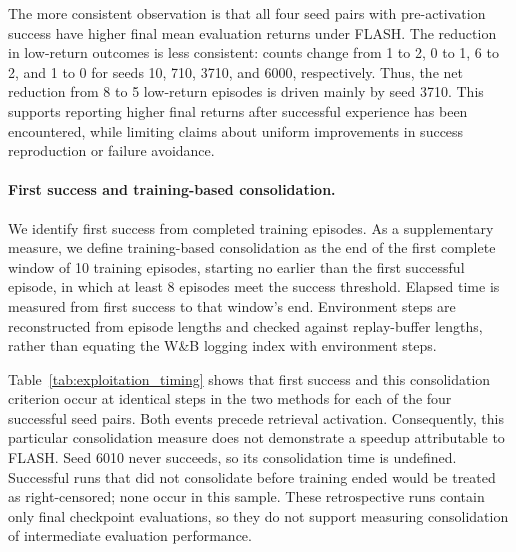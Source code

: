 \documentclass{article} %
\begin{document}
The more consistent observation is that all four seed pairs with pre-activation success have higher final mean evaluation returns under FLASH. The reduction in low-return outcomes is less consistent: counts change from 1 to 2, 0 to 1, 6 to 2, and 1 to 0 for seeds 10, 710, 3710, and 6000, respectively. Thus, the net reduction from 8 to 5 low-return episodes is driven mainly by seed 3710. This supports reporting higher final returns after successful experience has been encountered, while limiting claims about uniform improvements in success reproduction or failure avoidance.

\paragraph{First success and training-based consolidation.}
We identify first success from completed training episodes. As a supplementary measure, we define training-based consolidation as the end of the first complete window of 10 training episodes, starting no earlier than the first successful episode, in which at least 8 episodes meet the success threshold. Elapsed time is measured from first success to that window's end. Environment steps are reconstructed from episode lengths and checked against replay-buffer lengths, rather than equating the W\&B logging index with environment steps.

Table~\ref{tab:exploitation_timing} shows that first success and this consolidation criterion occur at identical steps in the two methods for each of the four successful seed pairs. Both events precede retrieval activation. Consequently, this particular consolidation measure does not demonstrate a speedup attributable to FLASH. Seed 6010 never succeeds, so its consolidation time is undefined. Successful runs that did not consolidate before training ended would be treated as right-censored; none occur in this sample. These retrospective runs contain only final checkpoint evaluations, so they do not support measuring consolidation of intermediate evaluation performance.
\end{document}
